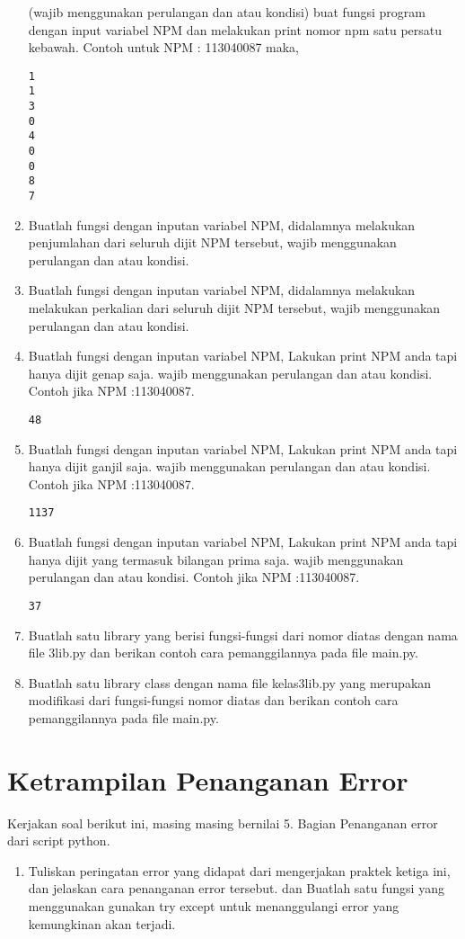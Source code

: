 \begin{enumerate}
\label{digitvar2}
(wajib menggunakan perulangan dan atau kondisi) buat fungsi program dengan input variabel NPM dan melakukan print nomor npm satu persatu kebawah.
Contoh untuk NPM : 113040087 maka,
\begin{verbatim}
1
1
3
0
4
0
0
8
7
\end{verbatim}
\item
Buatlah fungsi dengan inputan variabel NPM, didalamnya melakukan penjumlahan dari seluruh dijit NPM tersebut, wajib menggunakan perulangan dan atau kondisi.
\item 
Buatlah fungsi dengan inputan variabel NPM, didalamnya melakukan melakukan perkalian dari seluruh dijit NPM tersebut, wajib menggunakan perulangan dan atau kondisi.
\item
Buatlah fungsi dengan inputan variabel NPM, Lakukan print NPM anda tapi hanya dijit genap saja. wajib menggunakan perulangan dan atau kondisi. Contoh jika NPM :113040087.
\begin{verbatim}
48
\end{verbatim}
\item
Buatlah fungsi dengan inputan variabel NPM, Lakukan print NPM anda tapi hanya dijit ganjil saja. wajib menggunakan perulangan dan atau kondisi. Contoh jika NPM :113040087.
\begin{verbatim}
1137
\end{verbatim}
\item 
Buatlah fungsi dengan inputan variabel NPM, Lakukan print NPM anda tapi hanya dijit yang termasuk bilangan prima saja. wajib menggunakan perulangan dan atau kondisi. Contoh jika NPM :113040087.
\begin{verbatim}
37
\end{verbatim}
\item
Buatlah satu library yang berisi fungsi-fungsi dari nomor diatas dengan nama file 3lib.py dan berikan contoh cara pemanggilannya pada file main.py.
\item
Buatlah satu library class dengan nama file kelas3lib.py yang merupakan modifikasi dari fungsi-fungsi nomor diatas dan berikan contoh cara pemanggilannya  pada file main.py.
\end{enumerate}


\section{Ketrampilan Penanganan Error}
Kerjakan soal berikut ini, masing masing bernilai 5. Bagian Penanganan error dari script python.
\begin{enumerate}
\item
Tuliskan peringatan error yang didapat dari mengerjakan praktek ketiga ini, dan jelaskan cara penanganan error tersebut.
dan Buatlah satu fungsi yang menggunakan gunakan try except untuk menanggulangi error yang kemungkinan akan terjadi.
\end{enumerate}

